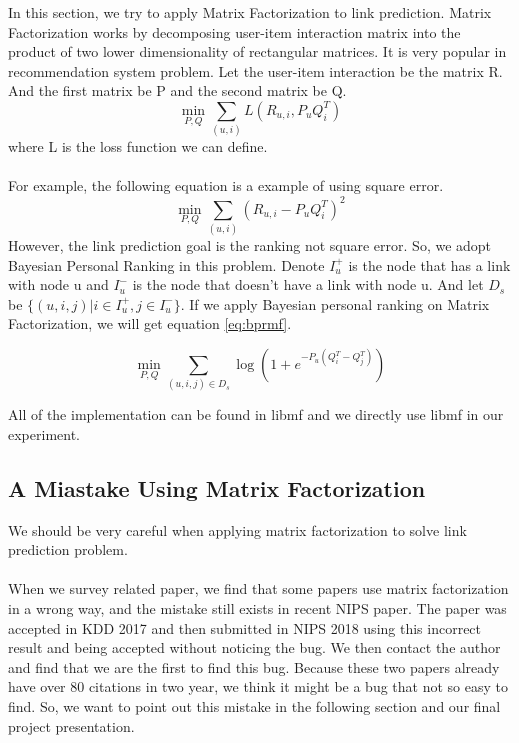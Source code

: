 \documentclass[12pt]{article}
\begin{document}
In this section, we try to apply Matrix Factorization to link prediction. Matrix Factorization works by decomposing user-item interaction matrix into the product of two lower dimensionality of rectangular matrices. It is very popular in recommendation system problem. Let the user-item interaction be the matrix R. And the first matrix be P and the second matrix be Q.  
\\
\begin{equation}
\min_{P,Q}{\sum_{(u,i)}{L(R_{u,i}, P_uQ_i^T)}}
\end{equation}
where L is the loss function we can define. \\
\\
For example, the following equation is a example of using square error. \\
\begin{equation}
\min_{P,Q}{\sum_{(u,i)}{(R_{u,i}-P_uQ_i^T)^2}}
\end{equation}
However, the link prediction goal is the ranking not square error. So, we adopt Bayesian Personal Ranking\cite{bpr} in this problem. Denote $I_u^+$ is the node that has a link with node u and $I_u^-$ is the node that doesn't have a link with node u. And let $D_s$ be $\{(u,i,j)|i \in I_u^+, j \in I_u^-\}$. If we apply Bayesian personal ranking on Matrix Factorization, we will get equation \ref{eq:bprmf}.

\begin{equation}
\min_{P,Q} \sum_{(u,i,j)\in D_s}\log(1+e^{-P_u(Q_i^T - Q_j^T)})
\label{eq:bprmf}
\end{equation}

All of the implementation can be found in libmf\cite{libmf} and we directly use libmf in our experiment.

\subsection{A Miastake Using Matrix Factorization}
We should be very careful when applying matrix factorization to solve link prediction problem.
\\ \\
When we survey related paper, we find that some papers use matrix factorization in a wrong way, and the mistake still exists in recent NIPS paper. The paper was accepted in KDD 2017 and then submitted in NIPS 2018 using this incorrect result and being accepted without noticing the bug. We then contact the author and find that we are the first to find this bug. Because these two papers already have over 80 citations in two year, we think it might be a bug that not so easy to find. So, we want to point out this mistake in the following section and our final project presentation.   
\end{document}
